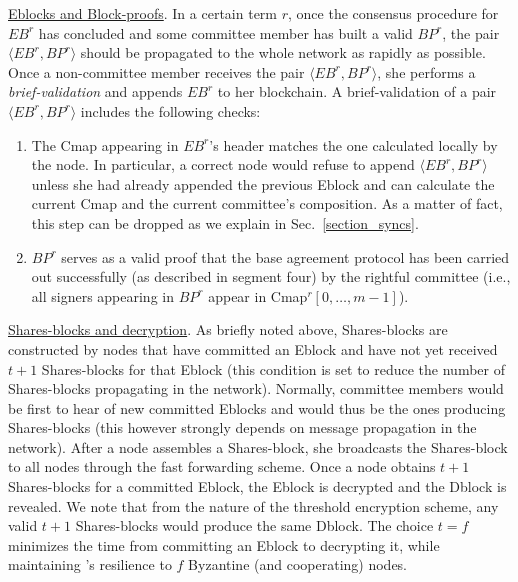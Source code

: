 \underline{Eblocks and Block-proofs}.
In a certain term $r$, once the consensus procedure for $EB^r$ has concluded and some committee member has built a valid $BP^r$, the pair $\langle EB^r, BP^r \rangle$ should be propagated to the whole network as rapidly as possible. Once a non-committee member receives the pair $\langle EB^r, BP^r \rangle$, she performs a \emph{brief-validation} and appends $EB^r$ to her blockchain. A brief-validation of a pair $\langle EB^r, BP^r \rangle$ includes the following checks: 
\begin{enumerate}
\item The Cmap appearing in $EB^r$'s header matches the one calculated locally by the node. In particular, a correct node would refuse to append $\langle EB^r, BP^r \rangle$ unless she had already appended the previous Eblock and can calculate the current Cmap and the current committee's composition.  As a matter of fact, this step can be dropped as we explain in Sec.~\ref{section_syncs}.
\item $BP^r$ serves as a valid proof that the base agreement protocol has been carried out successfully (as described in segment four) by the rightful committee (i.e., all signers appearing in $BP^r$ appear in Cmap$^r[0,\dots,m-1]$). 
\end{enumerate}


\underline{Shares-blocks and decryption}.
As briefly noted above, Shares-blocks are constructed by nodes that have committed an Eblock and have not yet received $t+1$ Shares-blocks for that Eblock (this condition is set to reduce the number of Shares-blocks propagating in the network). Normally, committee members would be first to hear of new committed Eblocks and would thus be the ones producing Shares-blocks (this however strongly depends on message propagation in the network). After a node assembles a Shares-block, she broadcasts the Shares-block to all nodes through the fast forwarding scheme. Once a node obtains $t+1$ Shares-blocks for a committed Eblock, the Eblock is decrypted and the Dblock is revealed. We note that from the nature of the threshold encryption scheme, any valid $t+1$ Shares-blocks would produce the same Dblock. The choice $t=f$ minimizes the time from committing an Eblock to decrypting it, while maintaining \nameNS's resilience to $f$ Byzantine (and cooperating) nodes.

